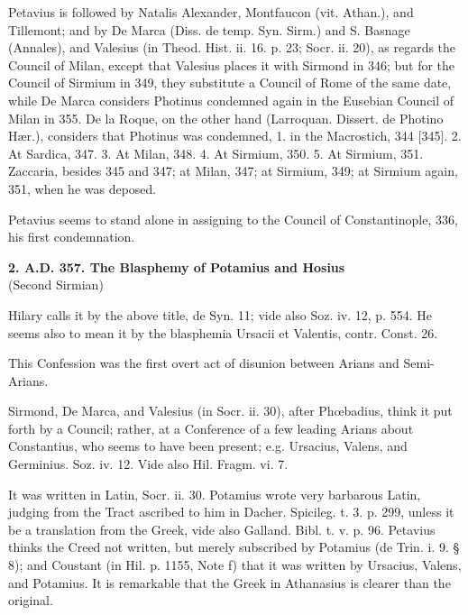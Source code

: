 Petavius is followed by Natalis Alexander, Montfaucon (vit. Athan.),
and Tillemont; and by De Marca (Diss. de temp. Syn. Sirm.) and S.
Basnage (Annales), and Valesius (in Theod. Hist. ii. 16. p. 23; Socr.
ii. 20), as regards the Council of Milan, except that Valesius places
it with Sirmond in 346; but for the Council of Sirmium in 349, they
substitute a Council of Rome of the same date, while De Marca
considers Photinus condemned again in the Eusebian Council of Milan in
355. De la Roque, on the other hand (Larroquan. Dissert. de Photino
Hær.), considers that Photinus was condemned, 1. in the Macrostich,
344 [345]. 2. At Sardica, 347. 3. At Milan, 348. 4. At Sirmium, 350.
5. At Sirmium, 351. Zaccaria, besides 345 and 347; at Milan, 347; at
Sirmium, 349; at Sirmium again, 351, when he was deposed.

Petavius seems to stand alone in assigning to the Council of
Constantinople, 336, his first condemnation.

\textbf{2. A.D. 357. The
Blasphemy of Potamius and Hosius}\\
(Second Sirmian)

Hilary calls it by the above title, de Syn. 11; vide also Soz. iv.
12, p. 554. He seems also to mean it by the blasphemia Ursacii et
Valentis, contr. Const. 26.

This Confession was the first overt act of disunion between Arians
and Semi-Arians.

Sirmond, De Marca, and Valesius (in Socr. ii. 30), after Phœbadius,
think it put forth by a Council; rather, at a Conference of a few
leading Arians about Constantius, who seems to have been present; e.g.
Ursacius, Valens, and Germinius. Soz. iv. 12. Vide also Hil. Fragm.
vi. 7.

It was written in Latin, Socr. ii. 30. Potamius wrote very
barbarous Latin, judging from the Tract ascribed to him in Dacher.
Spicileg. t. 3. p. 299, unless it be a translation from the
Greek, vide also Galland. Bibl. t. v. p. 96. Petavius thinks the Creed
not written, but merely subscribed by Potamius (de Trin. i. 9. § 8);
and Coustant (in Hil. p. 1155, Note f) that it was written by Ursacius,
Valens, and Potamius. It is remarkable that the Greek in Athanasius is
clearer than the original.

